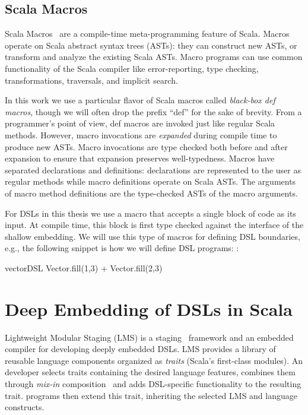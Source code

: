 \subsection{Scala Macros}
\label{sec:scala-macros}

Scala Macros~\cite{burmako_scala_2013} are a compile-time meta-programming
 feature of Scala. Macros operate on Scala abstract syntax trees (ASTs): they
 can construct new ASTs, or transform and analyze the existing Scala ASTs.
 Macro programs can use common functionality of the Scala compiler like
 error-reporting, type checking, transformations, traversals, and implicit
 search.

In this work we use a particular flavor of Scala macros called \emph{black-box def
 macros}, though we will often drop the prefix ``def'' for the
 sake of brevity.  From a programmer's point of view, def macros
 are invoked just like regular Scala methods.  However, macro
 invocations are \emph{expanded} during compile time to produce new
 ASTs.  Macro invocations are type checked both before and after
 expansion to ensure that expansion preserves well-typedness.  Macros
 have separated declarations and definitions: declarations are
 represented to the user as regular methods while macro definitions
 operate on Scala ASTs.  The arguments of macro method definitions are
 the type-checked ASTs of the macro arguments.

For DSLs in this thesis we use a macro that accepts a single block of
 code as its input. At compile time, this block is first type checked
 against the interface of the shallow embedding.  We will use this type of macros
 for defining DSL boundaries, e.g., the following snippet is how we will define DSL
 programs:
:\begin{lstparagraph}
vectorDSL {
  Vector.fill(1,3) + Vector.fill(2,3)
}
\end{lstparagraph}


\section{Deep Embedding of DSLs in Scala}
\label{sec:embedded-domain-specific-languages}


Lightweight Modular Staging (LMS) is a
staging~\cite{taha_multi-stage_1997} framework and an embedded
compiler for developing deeply embedded DSLs.  LMS provides a library
of reusable language components organized as \emph{traits} (Scala's
first-class modules).  An \edsl developer selects traits containing
the desired language features, combines them through \emph{mix-in}
composition~\cite{odersky_scalable_2005} and adds DSL-specific
functionality to the resulting \edsl trait.  \edsl programs then
extend this trait, inheriting the selected LMS and \edsl language
constructs.

